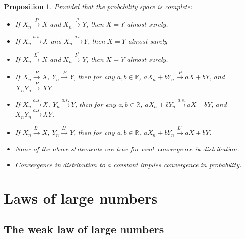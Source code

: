\documentclass[12pt,reqno]{article}
\theoremstyle{plain}
\newtheorem{prop}[theorem]{Proposition}
\theoremstyle{definition}
\begin{document}
\begin{prop}
Provided that the probability space is complete: 
\begin{itemize} 

\item If $X_n \xrightarrow{P} X$ and $X_n \xrightarrow{P} Y$, then 
     $X = Y$ almost surely. 
\item If $X_n \xrightarrow{a.s.} X$ and $X_n \xrightarrow{a.s.} Y$, then 
     $X = Y$ almost surely. 
\item If $X_n \xrightarrow{L^r} X$ and $X_n \xrightarrow{L^r} Y$, then 
     $X = Y$ almost surely. 
\item If $X_n \xrightarrow{P} X$, $Y_n \xrightarrow{P} Y$, then for any 
     $a,b \in \mathbb{R}$, $aX_n+bY_n \xrightarrow{P} aX+bY$, and 
     $X_nY_n \xrightarrow{P} XY$. 
\item If $X_n \xrightarrow{a.s.} X$, $Y_n \xrightarrow{a.s.} Y$, 
     then for any 
     $a,b \in \mathbb{R}$, $aX_n+bY_n \xrightarrow{a.s.} aX+bY$, and 
     $X_nY_n \xrightarrow{a.s.} XY$. 
\item If $X_n \xrightarrow{L^r} X$, $Y_n \xrightarrow{L^r} Y$, then for any 
     $a,b \in \mathbb{R}$, $aX_n+bY_n \xrightarrow{L^r} aX+bY$. 
\item None of the above statements are true for weak convergence in 
     distribution. 
\item Convergence in distribution to a constant implies convergence in 
     probability. 

\end{itemize} 
\end{prop} 

\newpage 
\section{Laws of large numbers} 

\subsection{The weak law of large numbers} 
\end{document}
